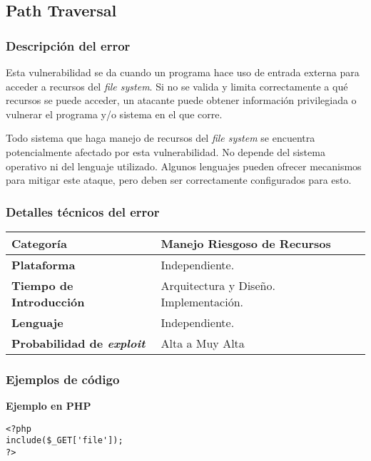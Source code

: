 \subsection{Path Traversal}

\subsubsection{Descripción del error}

Esta vulnerabilidad se da cuando un programa hace uso de entrada externa para acceder a recursos del \textit{file system}.
Si no se valida y limita correctamente a qué recursos se puede acceder, un atacante puede obtener información privilegiada o vulnerar el programa y/o sistema en el que corre.

Todo sistema que haga manejo de recursos del \textit{file system} se encuentra potencialmente afectado por esta vulnerabilidad.
No depende del sistema operativo ni del lenguaje utilizado.
Algunos lenguajes pueden ofrecer mecanismos para mitigar este ataque, pero deben ser correctamente configurados para esto.

\subsubsection{Detalles técnicos del error}
\begin{tabular}[\baselineskip]{|l|p{7cm}|}
  \hline
  \textbf{Categoría} & Manejo Riesgoso de Recursos \\
  \hline
  \textbf{Plataforma} & Independiente. \\
  \hline
  \textbf{Tiempo de Introducción} &  Arquitectura y Diseño. Implementación. \\
  \hline
  \textbf{Lenguaje} & Independiente.\\
  \hline
  \textbf{Probabilidad de \emph{exploit}} & Alta a Muy Alta \\
  \hline
\end{tabular}

\subsubsection{Ejemplos de código}

\noindent \textbf{Ejemplo en PHP}\\

\begin{lstlisting}[frame=single]
<?php
include($_GET['file']);
?>
\end{lstlisting}


